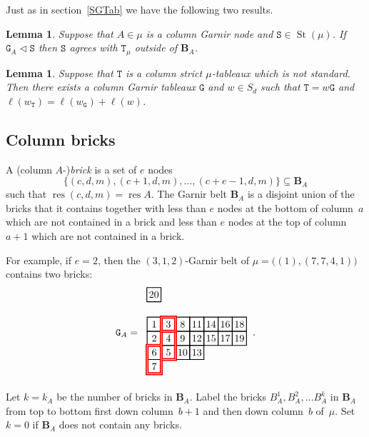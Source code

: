 \documentclass[twoside,11pt,reqno]{amsart}
\numberwithin{equation}{section}
\newtheorem{Lemma}[equation]{Lemma}
\theoremstyle{definition}  %
\DeclareMathOperator\ldom {\triangleleft}
\newcommand{\res}{\operatorname{res}}
\newcommand{\St}{\operatorname{St}}
\newcommand{\Stab}{\operatorname{Stab}}
\newcommand{\0}{{\bar 0}}
\newcommand{\1}{{\bar 1}}
\def\Belt{\mathbf{B}}
\newcommand\Par[1][]{{\mathscr P}^{\kappa#1}}
\def\T{{\mathtt T}}
\def\Stab{{\mathtt S}}
\def\G{{\mathtt G}}
\newcommand\Tableau[2][\relax]{
  \begin{tikzpicture}[scale=0.5,draw/.append style={thick,black}]
    \ifx\relax#1\relax%
    \else %
      \foreach\box in {#1} { \filldraw[blue!30]\box+(-.5,-.5)rectangle++(.5,.5); }
    \fi
    \newcount\row\newcount\col
    \row=0
    \foreach \Row in {#2} {
       \col=1
       \foreach\k in \Row {
          \draw(\the\col,\the\row)+(-.5,-.5)rectangle++(.5,.5);
          \draw(\the\col,\the\row)node{\k};
          \global\advance\col by 1
       }
       \global\advance\row by -1
    }
  \end{tikzpicture}
}
\begin{document}
Just as in section~\ref{SGTab} we have the following two results.

\begin{Lemma}\label{signed LAgrees} %
Suppose that $A\in \mu$ is a column Garnir node and $\Stab\in\St(\mu)$. 
If $\G_A\ldom\Stab$ then $\Stab$ agrees with $\T_\mu$ outside of $\Belt_A$. 
\end{Lemma}


\begin{Lemma} \label{signed LAndrew}%
Suppose that %
$\T$ is a column strict $\mu$-tableaux which is not standard. Then
there exists a column Garnir tableaux $\G$ and $w\in S_d$ such that
$\T=w\G$ and $\ell(w_\T)=\ell(w_\G)+\ell(w)$. 
\end{Lemma}

\subsection{Column bricks}\label{SSColBricks}
A (column $A$-){\em brick} is a set of $e$ nodes 
$$\{(c,d,m),(c+1,d,m),\dots,(c+e-1,d,m)\}\subseteq \Belt_A$$
such that $\res(c,d,m)=\res A$. The Garnir belt
$\Belt_A$ is a disjoint union of the bricks that it contains together with
less than $e$ nodes at the bottom of column~$a$ which are not contained in a brick and less than $e$ 
nodes at the top of column~$a+1$ which are not contained in a brick. 

For example, if $e=2$, then the $(3,1,2)$-Garnir belt of
$\mu=\big((1),(7,7,4,1)\big)$ contains two bricks: 
$$\G_A=\begin{array}{l}
\Tableau{{20}}\\[10pt]
\begin{tikzpicture}[scale=0.5,draw/.append style={thick,black}]
  \newcount\col
  \foreach\Row/\row in {{1,3,8,11,14,16,18}/0,{2,4,9,12,15,17,19}/-1,{6,5,10,13}/-2,{7}/-3} {
     \col=1
     \foreach\k in \Row {
        \draw(\the\col,\row)+(-.5,-.5)rectangle++(.5,.5);
        \draw(\the\col,\row)node{\k};
        \global\advance\col by 1
      }
   }
   \draw[red,double,very thick]
     (0.5,-3.5)--++(0,2)--++(1,0)--++(0,2)--++(1,0)--++(0,-3)--++(-1,0)--++(0,-1)--cycle;
   \draw[red,double,very thick](1.5,-2.5)--(1.5,-1.5);
   \draw[red,double,very thick](1.5,-0.5)--(2.5,-0.5);
\end{tikzpicture}
\end{array}.$$


Let $k=k_A$ be the number of bricks in $\Belt_A$. Label the bricks $B^1_A,B^2_A,\dots B^k_A$ in $\Belt_A$
from top to bottom first down column~$b+1$ and then down column~$b$ of~$\mu$.  
Set $k=0$ if $\Belt_A$ does not contain any bricks.
\end{document}
